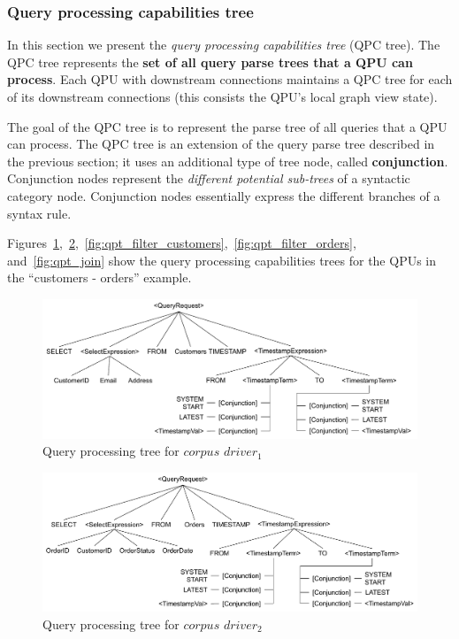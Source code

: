 \subsubsection{Query processing capabilities tree}
\label{sec:qpc_tree}

In this section we present the \textit{query processing capabilities tree} (QPC tree).
The QPC tree represents the \textbf{set of all query parse trees that a QPU can process}.
Each QPU with downstream connections maintains a QPC tree for each of its downstream connections
(this consists the QPU's local graph view state).

The goal of the QPC tree is to represent the parse tree of all queries that a QPU can process.
The QPC tree is an extension of the query parse tree described in the previous section;
it uses an additional type of tree node, called \textbf{conjunction}.
Conjunction nodes represent the \textit{different potential sub-trees} of a syntactic category node.
Conjunction nodes essentially express the different branches of a syntax rule.

Figures~\ref{fig:qpt_corpus_driver_customers},~\ref{fig:qpt_corpus_driver_orders},~\ref{fig:qpt_filter_customers},~\ref{fig:qpt_filter_orders}, and~\ref{fig:qpt_join}
show the query processing capabilities trees for the QPUs in the ``customers - orders'' example.

\begin{figure}[t]
  \centering
    \includegraphics[width=\textwidth]{./figures/design_pattern/qpt_corpus_driver_customers.pdf}
  \caption{Query processing tree for $corpus$ $driver_1$}
  \label{fig:qpt_corpus_driver_customers}
\end{figure}

\begin{figure}[t]
  \centering
    \includegraphics[width=\textwidth]{./figures/design_pattern/qpt_corpus_driver_orders.pdf}
  \caption{Query processing tree for $corpus$ $driver_2$}
  \label{fig:qpt_corpus_driver_orders}
\end{figure}

